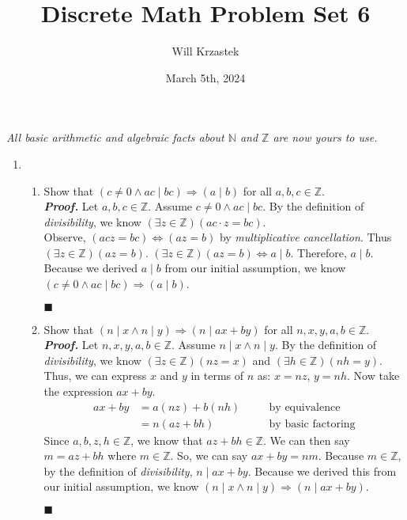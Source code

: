 \documentclass[11pt,a4paper]{article}
\begin{document}
 
\title{Discrete Math Problem Set 6}
\author{Will Krzastek}
\date{March 5th, 2024}
\maketitle
\emph{All basic arithmetic and algebraic facts about $\mathbb{N}$ and $\mathbb{Z}$ are now yours to use.}

\begin{enumerate}
    \item 
    \begin{enumerate}

        \item 
        Show that $(c \neq 0 \land ac \mid bc) \Rightarrow (a \mid b) $ for all $a, b, c \in \mathbb{Z} $. \\
        \emph{\textbf{Proof.}} Let $a, b, c \in \mathbb{Z}$. Assume $c \neq 0 \land ac \mid bc $. By the definition of \emph{divisibility}, 
        we know $(\exists z \in \mathbb{Z}) (ac \cdot z = bc)$. \\ 
        Observe, $(acz = bc) \Leftrightarrow (az = b)$ by \emph{multiplicative cancellation}. Thus $(\exists z \in \mathbb{Z})(az = b) $. $ (\exists z \in \mathbb{Z})(az = b) \Leftrightarrow a \mid b$.
        Therefore, $a \mid b $. Because we derived $a \mid b $ from our initial assumption, we know $(c \neq 0 \land ac \mid bc) \Rightarrow (a \mid b) $.
        \begin{flushright}
            $\blacksquare$
        \end{flushright}

        \item 
        Show that $(n \mid x \land n \mid y) \Rightarrow (n \mid ax + by) $ for all $n, x, y, a, b \in \mathbb{Z} $. \\
        \emph{\textbf{Proof.}} Let $n, x, y, a, b \in \mathbb{Z} $. Assume $n \mid x \land n \mid y $.
        By the definition of \emph{divisibility}, we know $(\exists z \in \mathbb{Z}) (nz = x)$ and $(\exists h \in \mathbb{Z})(nh = y) $.
        Thus, we can express $x $ and $y$ in terms of $n$ as: $x = nz  $, $y = nh $. Now take the expression $ax + by$.
        \begin{align*}
            ax + by 
                &= a(nz) + b(nh)
                    &\quad
                    &\text{by equivalence} \\
                &= n(az + bh)
                    &\quad
                    &\text{by basic factoring}
        \end{align*}
        Since $a, b, z, h \in \mathbb{Z} $, we know that $az + bh \in \mathbb{Z} $. We can then say $m = az + bh $ where $m \in \mathbb{Z} $.
        So, we can say $ax + by = nm$. Because $m \in \mathbb{Z}$, by the definition of \emph{divisibility}, $n \mid ax + by $.
        Because we derived this from our initial assumption, we know $(n \mid x \land n \mid y)\Rightarrow (n \mid ax + by) $.
        \begin{flushright}
            $\blacksquare$
        \end{flushright}
    \end{enumerate}


\end{enumerate}
\end{document}
